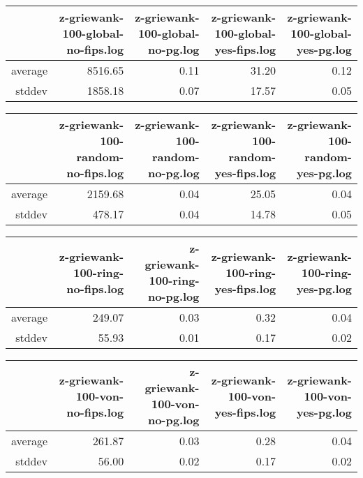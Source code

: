 \begin{table}[ht]
\centering
\begin{tabular}{rrrrr}
  \hline
 & z-griewank-100-global-no-fips.log & z-griewank-100-global-no-pg.log & z-griewank-100-global-yes-fips.log & z-griewank-100-global-yes-pg.log \\ 
  \hline
average & 8516.65 & 0.11 & 31.20 & 0.12 \\ 
  stddev & 1858.18 & 0.07 & 17.57 & 0.05 \\ 
   \hline
\end{tabular}
\end{table}
\begin{table}[ht]
\centering
\begin{tabular}{rrrrr}
  \hline
 & z-griewank-100-random-no-fips.log & z-griewank-100-random-no-pg.log & z-griewank-100-random-yes-fips.log & z-griewank-100-random-yes-pg.log \\ 
  \hline
average & 2159.68 & 0.04 & 25.05 & 0.04 \\ 
  stddev & 478.17 & 0.04 & 14.78 & 0.05 \\ 
   \hline
\end{tabular}
\end{table}
\begin{table}[ht]
\centering
\begin{tabular}{rrrrr}
  \hline
 & z-griewank-100-ring-no-fips.log & z-griewank-100-ring-no-pg.log & z-griewank-100-ring-yes-fips.log & z-griewank-100-ring-yes-pg.log \\ 
  \hline
average & 249.07 & 0.03 & 0.32 & 0.04 \\ 
  stddev & 55.93 & 0.01 & 0.17 & 0.02 \\ 
   \hline
\end{tabular}
\end{table}
\begin{table}[ht]
\centering
\begin{tabular}{rrrrr}
  \hline
 & z-griewank-100-von-no-fips.log & z-griewank-100-von-no-pg.log & z-griewank-100-von-yes-fips.log & z-griewank-100-von-yes-pg.log \\ 
  \hline
average & 261.87 & 0.03 & 0.28 & 0.04 \\ 
  stddev & 56.00 & 0.02 & 0.17 & 0.02 \\ 
   \hline
\end{tabular}
\end{table}
